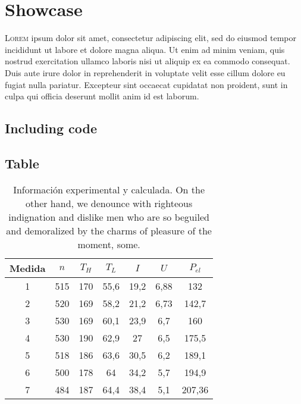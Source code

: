 

\chapter{Showcase}



\lettrine{L}{orem} ipsum dolor sit amet, consectetur
adipiscing elit, sed do eiusmod tempor incididunt ut labore et dolore magna
aliqua. Ut enim ad minim veniam, quis nostrud exercitation ullamco laboris nisi
ut aliquip ex ea commodo consequat. Duis aute irure dolor in reprehenderit in
voluptate velit esse cillum dolore eu fugiat nulla pariatur. Excepteur sint
occaecat cupidatat non proident, sunt in culpa qui officia deserunt mollit anim
id est laborum.


\section{Including code}



\section{Table}

\begin{table}[htb]
  \centering
  \renewcommand{\arraystretch}{1.25}
  \setlength{\tabcolsep}{1.5\tabcolsep}
  \caption{Información experimental y calculada. On the other hand, we denounce
    with righteous indignation and dislike men who are so beguiled and
    demoralized by the charms of pleasure of the moment, some.}
  \label{tab:info}
  \begin{tabular}{*7c} \toprule
    Medida & $n$ & $T_H$ & $T_L$ & $I$ & $U$ & $P_{el}$ \\
    \midrule
    1  & 515 & 170 & 55,6 & 19,2  & 6,88 & 132    \\
    2  & 520 & 169 & 58,2 & 21,2  & 6,73 & 142,7  \\
    3  & 530 & 169 & 60,1 & 23,9  & 6,7  & 160    \\
    4  & 530 & 190 & 62,9 & 27    & 6,5  & 175,5  \\
    5  & 518 & 186 & 63,6 & 30,5  & 6,2  & 189,1  \\
    6  & 500 & 178 & 64   & 34,2  & 5,7  & 194,9  \\
    7  & 484 & 187 & 64,4 & 38,4  & 5,1  & 207,36 \\
    \bottomrule
  \end{tabular}
\end{table}
